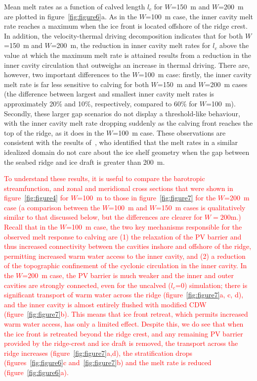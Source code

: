 \documentclass[draft]{agujournal2019}
\begin{document}
Mean melt rates as a function of calved length $l_c$ for $W$=150~m and $W$=200~m are plotted in figure~\ref{fig:figure6}a. As in the $W$=100~m case, the inner cavity melt rate reaches a maximum when the ice front is located offshore of the ridge crest. In addition, the velocity-thermal driving decomposition indicates that for both $W$=150~m and $W$=200~m, the reduction in inner cavity melt rates for $l_c$ above the value at which the maximum melt rate is attained results from a reduction in the inner cavity circulation that outweighs an increase in thermal driving. There are, however, two important differences to the $W$=100~m case: firstly, the inner cavity melt rate is far less sensitive to calving for both $W$=150~m and $W$=200~m cases (the difference between largest and smallest inner cavity melt rates is approximately 20\% and 10\%, respectively, compared to 60\% for $W$=100~m). Secondly, these larger gap scenarios do not display a threshold-like behaviour, with the inner cavity melt rate dropping suddenly as the calving front reaches the top of the ridge, as it does in the $W$=100~m case. These observations are consistent with the results of~, who identified that the melt rates in a similar idealized domain do not care about the ice shelf geometry when the gap between the seabed ridge and ice draft is greater than 200~m.

\textcolor{red}{To understand these results, it is useful to compare the barotropic streamfunction, and zonal and meridional cross sections that were shown in figure~\ref{fig:figure4} for $W$=100~m to those in figure~\ref{fig:figure7} for the $W$=200~m case (a comparison between the $W$=100~m and $W$=150~m cases is qualitatively similar to that discussed below, but the differences are clearer for $W = 200$m.) Recall that in the $W$=100~m case, the two key mechanisms responsible for the observed melt response to calving are (1) the relaxation of the PV barrier and thus increased connectivity between the cavities inshore and offshore of the ridge, permitting increased warm water access to the inner cavity, and (2) a reduction of the topographic confinement of the cyclonic circulation in the inner cavity. In the $W$=200~m case, the PV barrier is much weaker and the inner and outer cavities are strongly connected, even for the uncalved ($l_c$=0) simulation; there is significant transport of warm water across the ridge (figure~\ref{fig:figure7}a, c, d), and the inner cavity is almost entirely flushed with modified CDW (figure~\ref{fig:figure7}b). This means that ice front retreat, which permits increased warm water access, has only a limited effect. Despite this, we do see that when the ice front is retreated beyond the ridge crest, and any remaining PV barrier provided by the ridge-crest and ice draft is removed, the transport across the ridge increases (figure~\ref{fig:figure7}a,d), the stratification drops (figures~\ref{fig:figure6}c and~\ref{fig:figure7}b) and the melt rate is reduced (figure~\ref{fig:figure6}a).}
\end{document}
